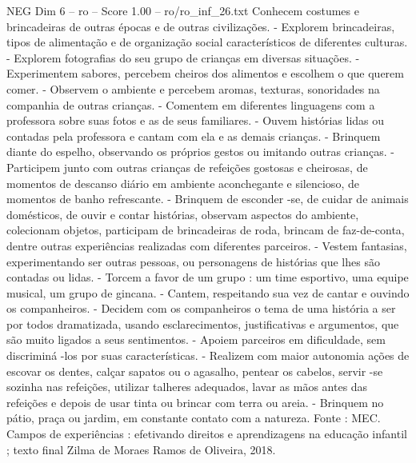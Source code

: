 \begin{textsample}{NEG Dim 6 – ro – Score 1.00 – ro/ro\_inf\_26.txt}
Conhecem costumes e brincadeiras de outras épocas e de outras civilizações. - Explorem brincadeiras, tipos de alimentação e de organização social característicos de diferentes culturas. - Explorem fotografias do seu grupo de crianças em diversas situações. - Experimentem sabores, percebem cheiros dos alimentos e escolhem o que querem comer. - Observem o ambiente e percebem aromas, texturas, sonoridades na companhia de outras crianças. - Comentem em diferentes linguagens com a professora sobre suas fotos e as de seus familiares. - Ouvem histórias lidas ou contadas pela professora e cantam com ela e as demais crianças. - Brinquem diante do espelho, observando os próprios gestos ou imitando outras crianças. - Participem junto com outras crianças de refeições gostosas e cheirosas, de momentos de descanso diário em ambiente aconchegante e silencioso, de momentos de banho refrescante. - Brinquem de esconder -se, de cuidar de animais domésticos, de ouvir e contar histórias, observam aspectos do ambiente, colecionam objetos, participam de brincadeiras de roda, brincam de faz-de-conta, dentre outras experiências realizadas com diferentes parceiros. - Vestem fantasias, experimentando ser outras pessoas, ou personagens de histórias que lhes são contadas ou lidas. - Torcem a favor de um grupo : um time esportivo, uma equipe musical, um grupo de gincana. - Cantem, respeitando sua vez de cantar e ouvindo os companheiros. - Decidem com os companheiros o tema de uma história a ser por todos dramatizada, usando esclarecimentos, justificativas e argumentos, que são muito ligados a seus sentimentos. - Apoiem parceiros em dificuldade, sem discriminá -los por suas características. - Realizem com maior autonomia ações de escovar os dentes, calçar sapatos ou o agasalho, pentear os cabelos, servir -se sozinha nas refeições, utilizar talheres adequados, lavar as mãos antes das refeições e depois de usar tinta ou brincar com terra ou areia. - Brinquem no pátio, praça ou jardim, em constante contato com a natureza.
Fonte : MEC.
Campos de experiências : efetivando direitos e aprendizagens na educação infantil ; texto final Zilma de Moraes Ramos de Oliveira, 2018.

\end{textsample}
